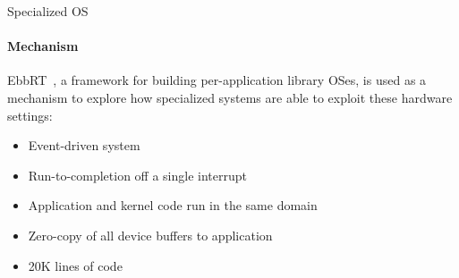 \documentclass[notes=only,10pt,xcolor=table]{beamer}
\begin{document}
\begin{frame}
{\begin{figure}
\end{figure}
}
\end{frame}

\begin{frame}{Specialized OS}
\framesubtitle{Mechanism}
EbbRT~\cite{ebbrt}, a framework for building per-application library OSes, is used as a mechanism to explore how specialized systems are able to exploit these hardware settings:
\begin{itemize}
    \item Event-driven system
    \item Run-to-completion off a single interrupt
    \item Application and kernel code run in the same domain
    \item Zero-copy of all device buffers to application
    \item 20K lines of code
\end{itemize}
\end{frame}
\end{document}
